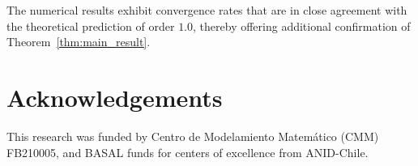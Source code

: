 \documentclass[reqno,  oneside, 12pt]{amsart}
\begin{document}
The numerical results exhibit convergence rates that are in close agreement with the theoretical prediction of order \(1.0\), thereby offering additional confirmation of Theorem~\ref{thm:main_result}.




\section*{Acknowledgements}
\sloppy
	This research was 
	funded by Centro de Modelamiento Matem\'atico (CMM) FB210005, and BASAL funds for centers of excellence from ANID-Chile. 

	
\end{document}

